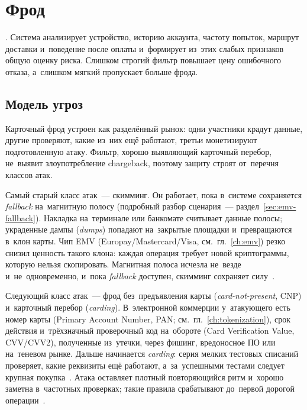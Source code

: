 
\chapter{Фрод}\label{ch:fraud}
. Система анализирует устройство, историю аккаунта,
частоту попыток, маршрут доставки и~поведение после оплаты и~формирует
из~этих слабых признаков общую оценку риска. Слишком строгий фильтр повышает
цену ошибочного отказа, а~слишком мягкий пропускает больше фрода.

\section{Модель угроз}\label{sec:fraud-threats}

Карточный фрод устроен как разделённый рынок: одни участники крадут данные,
другие проверяют, какие из~них ещё работают, третьи монетизируют подготовленную
атаку. Фильтр, хорошо выявляющий карточный перебор, не~выявит злоупотребление
chargeback, поэтому защиту строят от~перечня классов атак.

Самый старый класс атак~--- скимминг. Он работает, пока в~системе сохраняется
\textit{fallback} на~магнитную полосу (подробный разбор сценария~---
раздел~\ref{sec:emv-fallback}). Накладка на~терминале или банкомате считывает
данные полосы; украденные дампы (\textit{dumps}) попадают на~закрытые площадки
и~превращаются в~клон карты. Чип EMV (Europay\slash Mastercard\slash Visa,
см.~гл.~\ref{ch:emv}) резко снизил ценность такого клона: каждая операция
требует новой криптограммы, которую нельзя скопировать. Магнитная полоса
исчезла не~везде и~не~одновременно, и~пока \textit{fallback} доступен, скимминг
сохраняет силу~\cite{emvco-book1}.

Следующий класс атак~--- фрод без~предъявления карты
(\textit{card-not-present}, CNP) и~карточный перебор (\textit{carding}).
В~электронной коммерции у~атакующего есть номер карты
(Primary Account Number, PAN; см.~гл.~\ref{ch:tokenization}), срок действия
и~трёхзначный проверочный код на~обороте (Card Verification Value, CVV/CVV2),
полученные из~утечки, через фишинг, вредоносное ПО или на~теневом рынке. Дальше
начинается \textit{carding}: серия мелких тестовых списаний проверяет, какие
реквизиты ещё работают, а~за~успешными тестами следует крупная
покупка~\cite{mc-fraudulent-merchants-2025}. Атака оставляет плотный
повторяющийся ритм и~хорошо заметна в~частотных проверках; такие правила
срабатывают до~первой дорогой операции~\cite{visa-auth-management-2020}.


